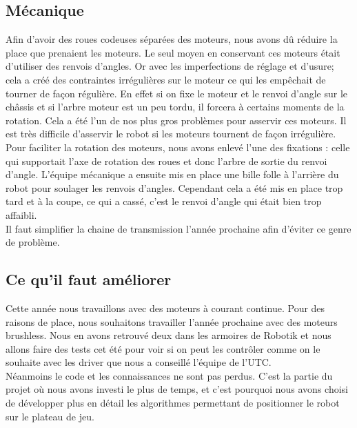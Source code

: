 \subsection{Mécanique}
Afin d'avoir des roues codeuses séparées des moteurs, nous avons dû réduire la place que prenaient les moteurs. Le seul moyen en conservant ces moteurs était d'utiliser des renvois d'angles. Or avec les imperfections de réglage et d'usure; cela a créé des contraintes irrégulières sur le moteur ce qui les empêchait de tourner de façon régulière. En effet si on fixe le moteur et le renvoi d'angle sur le châssis et si l'arbre moteur est un peu tordu, il forcera à certains moments de la rotation. Cela a été l'un de nos plus gros problèmes pour asservir ces moteurs. Il est très difficile d'asservir le robot si les moteurs tournent de façon irrégulière.\\

Pour faciliter la rotation des moteurs, nous avons enlevé l'une des fixations : celle qui supportait l'axe de rotation des roues et donc l'arbre de sortie du renvoi d'angle. L'équipe mécanique a ensuite mis en place une bille folle à l'arrière du robot pour soulager les renvois d'angles. Cependant cela a été mis en place trop tard et à la coupe, ce qui a cassé, c'est le renvoi d'angle qui était bien trop affaibli. \\

Il faut simplifier la chaine de transmission l'année prochaine afin d'éviter ce genre de problème.

\subsection{Ce qu'il faut améliorer}
Cette année nous travaillons avec des moteurs à courant continue. Pour des raisons de place, nous souhaitons travailler l'année prochaine avec des moteurs brushless. Nous en avons retrouvé deux dans les armoires de Robotik et nous allons faire des tests cet été pour voir si on peut les contrôler comme on le souhaite avec les driver que nous a conseillé l'équipe de l'UTC.\\

Néanmoins le code et les connaissances ne sont pas perdus. C'est la partie du projet où nous avons investi le plus de temps, et c'est pourquoi nous avons choisi de développer plus en détail les algorithmes permettant de positionner le robot sur le plateau de jeu.